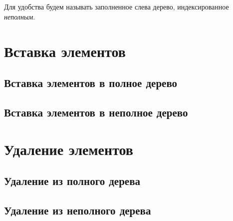 \begin{code}
\\
\>[0]\<[6]%
\>[6]  \AgdaSymbol{(} \AgdaSymbol{(} \AgdaSymbol{))}  \<%
\\
\>[0]\<[2]%
\>[2] \AgdaSymbol{:}  \AgdaSymbol{\{}\AgdaSymbol{\}}  \AgdaSymbol{(} \AgdaSymbol{:}   \AgdaSymbol{)}  \AgdaSymbol{(} \AgdaSymbol{:}   \AgdaSymbol{)}\<%
\\
\>[0]\<[6]%
\>[6]  \AgdaSymbol{(} \AgdaSymbol{)}  \<%
\\
\>\<\end{code}
Для удобства будем называть заполненное слева дерево, индексированное 
\emph{неполным}.

\section{Вставка элементов}
\label{sec:insert}

\subsection{Вставка элементов в полное дерево}
\label{sec:finsert}
\subsection{Вставка элементов в неполное дерево}
\label{sec:ainsert}

\section{Удаление элементов}
\label{sec:delete}
\subsection{Удаление из полного дерева}
\subsection{Удаление из неполного дерева}
